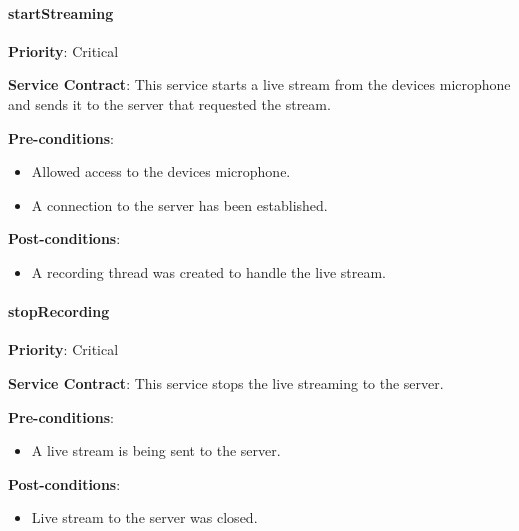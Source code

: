         \paragraph{startStreaming}
			\begin{description}
			    \item{\textbf{Priority}:} Critical%
			    \item{\textbf{Service Contract}:} This service starts a live stream from the devices microphone and sends it to the server that requested the stream.
			    \item{\textbf{Pre-conditions}:}%
    			    \begin{itemize}
    			        \item Allowed access to the devices microphone.
    			        \item A connection to the server has been established.
    			    \end{itemize}
			    \item{\textbf{Post-conditions}:} %
    			    \begin{itemize}
    			    \item A recording thread was created to handle the live stream.
    			    \end{itemize}
			\end{description}

        \paragraph{stopRecording}
			\begin{description}
			    \item{\textbf{Priority}:} Critical%
			    \item{\textbf{Service Contract}:} This service stops the live streaming to the server.%
			    \item{\textbf{Pre-conditions}:}%
    			    \begin{itemize}
    			        \item A live stream is being sent to the server.
    			    \end{itemize}
			    \item{\textbf{Post-conditions}:} %
    			    \begin{itemize}
    			    \item Live stream to the server was closed.
    			    \end{itemize}
			\end{description}

